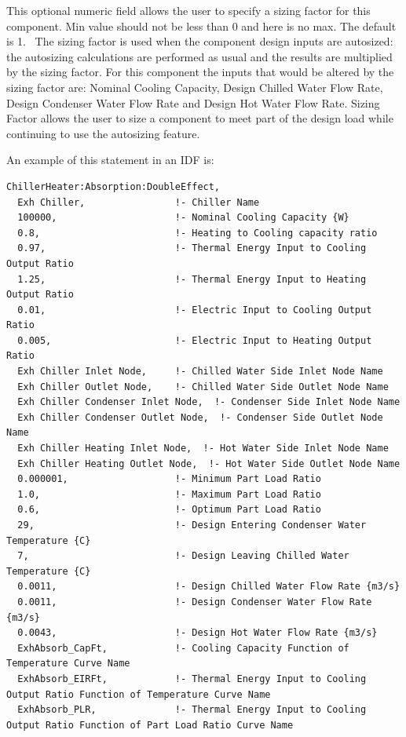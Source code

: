 This optional numeric field allows the user to specify a sizing factor for this component. Min value should not be less than 0 and here is no max. The default is 1.~ The sizing factor is used when the component design inputs are autosized: the autosizing calculations are performed as usual and the results are multiplied by the sizing factor. For this component the inputs that would be altered by the sizing factor are: Nominal Cooling Capacity, Design Chilled Water Flow Rate, Design Condenser Water Flow Rate and Design Hot Water Flow Rate. Sizing Factor allows the user to size a component to meet part of the design load while continuing to use the autosizing feature.

An example of this statement in an IDF is:

\begin{lstlisting}
ChillerHeater:Absorption:DoubleEffect,
  Exh Chiller,                !- Chiller Name
  100000,                     !- Nominal Cooling Capacity {W}
  0.8,                        !- Heating to Cooling capacity ratio
  0.97,                       !- Thermal Energy Input to Cooling Output Ratio
  1.25,                       !- Thermal Energy Input to Heating Output Ratio
  0.01,                       !- Electric Input to Cooling Output Ratio
  0.005,                      !- Electric Input to Heating Output Ratio
  Exh Chiller Inlet Node,     !- Chilled Water Side Inlet Node Name
  Exh Chiller Outlet Node,    !- Chilled Water Side Outlet Node Name
  Exh Chiller Condenser Inlet Node,  !- Condenser Side Inlet Node Name
  Exh Chiller Condenser Outlet Node,  !- Condenser Side Outlet Node Name
  Exh Chiller Heating Inlet Node,  !- Hot Water Side Inlet Node Name
  Exh Chiller Heating Outlet Node,  !- Hot Water Side Outlet Node Name
  0.000001,                   !- Minimum Part Load Ratio
  1.0,                        !- Maximum Part Load Ratio
  0.6,                        !- Optimum Part Load Ratio
  29,                         !- Design Entering Condenser Water Temperature {C}
  7,                          !- Design Leaving Chilled Water Temperature {C}
  0.0011,                     !- Design Chilled Water Flow Rate {m3/s}
  0.0011,                     !- Design Condenser Water Flow Rate {m3/s}
  0.0043,                     !- Design Hot Water Flow Rate {m3/s}
  ExhAbsorb_CapFt,            !- Cooling Capacity Function of Temperature Curve Name
  ExhAbsorb_EIRFt,            !- Thermal Energy Input to Cooling Output Ratio Function of Temperature Curve Name
  ExhAbsorb_PLR,              !- Thermal Energy Input to Cooling Output Ratio Function of Part Load Ratio Curve Name

\end{lstlisting}
